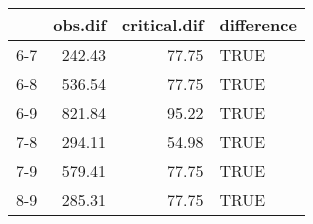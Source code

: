 \begin{table}[ht]
\centering
\begin{tabular}{rrrl}
  \hline
 & obs.dif & critical.dif & difference \\ 
  \hline
6-7 & 242.43 & 77.75 & TRUE \\ 
  6-8 & 536.54 & 77.75 & TRUE \\ 
  6-9 & 821.84 & 95.22 & TRUE \\ 
  7-8 & 294.11 & 54.98 & TRUE \\ 
  7-9 & 579.41 & 77.75 & TRUE \\ 
  8-9 & 285.31 & 77.75 & TRUE \\ 
   \hline
\end{tabular}
\end{table}
